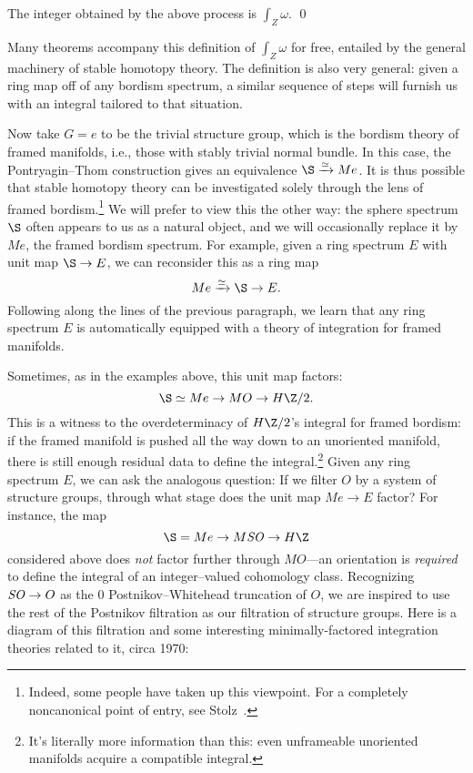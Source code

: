 \begin{lemma}%
The integer obtained by the above process is \(\int_Z \omega\). \qed
\end{lemma}

\noindent Many theorems accompany this definition of \(\int_Z \omega\) for free, entailed by the general machinery of stable homotopy theory.  The definition is also very general: given a ring map off of any bordism spectrum, a similar sequence of steps will furnish us with an integral tailored to that situation.

Now take \(G = e\) to be the trivial structure group, which is the bordism theory of framed manifolds, i.e., those with stably trivial normal bundle.  In this case, the Pontryagin--Thom construction gives an equivalence \(\S \xrightarrow{\simeq} Me\).  It is thus possible that stable homotopy theory can be investigated solely through the lens of framed bordism.\footnote{Indeed, some people have taken up this viewpoint.  For a completely noncanonical point of entry, see Stolz~\cite{Stolz}.}  We will prefer to view this the other way: the sphere spectrum \(\S\) often appears to us as a natural object, and we will occasionally replace it by \(Me\), the framed bordism spectrum.  For example, given a ring spectrum \(E\) with unit map \(\S \to E\), we can reconsider this as a ring map \[Me \xrightarrow{\simeq} \S \to E.\]  Following along the lines of the previous paragraph, we learn that any ring spectrum \(E\) is automatically equipped with a theory of integration for framed manifolds.

Sometimes, as in the examples above, this unit map factors: \[\S \simeq Me \to MO \to H\Z/2.\]  This is a witness to the overdeterminacy of \(H\Z/2\)'s integral for framed bordism: if the framed manifold is pushed all the way down to an unoriented manifold, there is still enough residual data to define the integral.\footnote{It's literally more information than this: even unframeable unoriented manifolds acquire a compatible integral.}  Given any ring spectrum \(E\), we can ask the analogous question: If we filter \(O\) by a system of structure groups, through what stage does the unit map \(Me \to E\) factor?  For instance, the map \[\S = Me \to M\SO \to H\Z\] considered above does \emph{not} factor further through \(MO\)---an orientation is \emph{required} to define the integral of an integer--valued cohomology class.  Recognizing \(\mathit{SO} \to O\) as the \(0\){\th} Postnikov--Whitehead truncation of \(O\), we are inspired to use the rest of the Postnikov filtration as our filtration of structure groups.  Here is a diagram of this filtration and some interesting minimally-factored integration theories related to it, circa 1970:
\begin{center}
\end{center}

